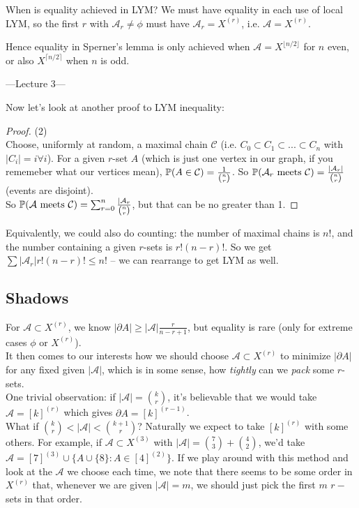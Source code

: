 \documentclass[a4paper]{article}
\begin{document}
When is equality achieved in LYM? We must have equality in each use of local LYM, so the first $r$ with $\mathcal{A}_r \neq \phi$ must have $\mathcal{A}_r = X^{(r)}$, i.e. $\mathcal{A} = X^{(r)}$.

Hence equality in Sperner's lemma is only achieved when $\mathcal{A} = X^{\lfloor n/2 \rfloor}$ for $n$ even, or also $X^{\lceil n/2 \rceil}$ when $n$ is odd.

---Lecture 3---

Now let's look at another proof to LYM inequality:
\begin{proof} (2) \\
    Choose, uniformly at random, a maximal chain $\mathcal{C}$ (i.e. $C_0 \subset C_1 \subset ... \subset C_n$ with $|C_i| =i \forall i$). For a given $r$-set $A$ (which is just one vertex in our graph, if you rememeber what our vertices mean), $\P(A \in \mathcal{C}) = \frac{1}{{n \choose r}}$. So $\P(\mathcal{A}_r \text{ meets } \mathcal{C}) = \frac{|\mathcal{A}_r|}{{n \choose r}}$ (events are disjoint).\\
    So $\P(\mathcal{A} \text{ meets } \mathcal{C}) = \sum_{r=0}^n \frac{|\mathcal{A}_r}{{n \choose r}}$, but that can be no greater than 1.
\end{proof}

\begin{rem}
    Equivalently, we could also do counting: the number of maximal chains is $n!$, and the number containing a given $r$-sets is $r!(n-r)!$. So we get $\sum|\mathcal{A}_r|r!(n-r)! \leq n!$ -- we can rearrange to get LYM as well.
\end{rem}

\subsection{Shadows}
For $\mathcal{A} \subset X^{(r)}$, we know $|\partial A| \geq |\mathcal{A}| \frac{r}{n-r+1}$, but equality is rare (only for extreme cases $\phi$ or $X^{(r)}$).\\
It then comes to our interests how we should choose $\mathcal{A} \subset X^{(r)}$ to minimize $|\partial A|$ for any fixed given $|\mathcal{A}|$, which is in some sense, how \emph{tightly} can we \emph{pack} some $r$-sets.\\
One trivial observation: if $|\mathcal{A}| = {k \choose r}$, it's believable that we would take $\mathcal{A} = [k]^{(r)}$ which gives $\partial A =[k]^{(r-1)}$.\\
What if ${k \choose r} < |\mathcal{A}| < {{k+1} \choose r}$? Naturally we expect to take $[k]^{(r)}$ with some others. For example, if $\mathcal{A} \subset X^{(3)}$ with $|\mathcal{A}| = {7 \choose 3} + {4 \choose 2}$, we'd take $\mathcal{A} = [7]^{(3)} \cup \{A \cup \{8\}: A \in [4]^{(2)}\}$. If we play around with this method and look at the $\mathcal{A}$ we choose each time, we note that there seems to be some order in $X^{(r)}$ that, whenever we are given $|\mathcal{A}| = m$, we should just pick the first $m$ $r-$sets in that order.
\end{document}
